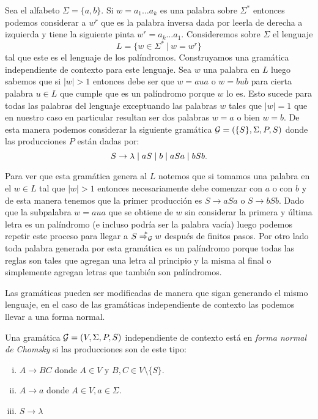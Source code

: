 \documentclass[tesis.tex]{subfiles}
\begin{document}
\begin{ej}\label{leng_ej_gram_palindromos}
	Sea el alfabeto $\Sigma = \{ a,b \}$. Si $w=a_1 \dots a_k$ es una palabra sobre $\Sigma^*$ entonces podemos considerar a $w^r$ que es la palabra inversa dada por leerla de derecha a izquierda y tiene la siguiente pinta $w^r= a_k \dots a_1$. 
	Consideremos sobre $\Sigma$ el lenguaje 
	\[
	L = \{ w \in \Sigma^* \ | \ w = w^r  \}
	\]
	tal que este es el lenguaje de los palíndromos. 
	Construyamos una gramática independiente de contexto para este lenguaje.
	Sea $w$ una palabra en $L$ luego sabemos que si $|w| > 1$ entonces debe ser que $w = a u a$ o $w = b u b$ para cierta palabra $u \in L$ que cumple que es un palíndromo porque $w$ lo es. 
	Esto sucede para todas las palabras del lenguaje exceptuando las palabras $w$ tales que $|w|=1$ que en nuestro caso en particular resultan ser dos palabras $w=a$ o bien $w = b$. 
	De esta manera podemos considerar la siguiente gramática ${\cal G}  =  (\{S\}, \Sigma, P, S )$ donde las producciones $P$ están dadas por:
	\begin{equation*}
		S  \to \lambda \\ \mid a \\ S  \mid  b \\ \mid aSa \\ \mid bSb. \\
	\end{equation*}

	Para ver que esta gramática genera al $L$ notemos que si tomamos una palabra en el $w \in L$ tal que $|w| > 1$ entonces necesariamente debe comenzar con $a$ o con $b$ y de esta manera tenemos que la primer producción es $S \to aSa$ o $S \to bSb$. 
	Dado que la subpalabra $w = aua$ que se obtiene de $w$ sin considerar la primera y última letra es un palíndromo (e incluso podría ser la palabra vacía) luego podemos repetir este proceso para llegar a $S \overset{*}{\Rightarrow_{\cal G}} w$ después de finitos pasos. 
	Por otro lado toda palabra generada por esta gramática es un palíndromo porque todas las reglas son tales que agregan una letra al principio y la misma al final o simplemente agregan letras que también son palíndromos.
\end{ej}

Las gramáticas pueden ser modificadas de manera que sigan generando el mismo lenguaje, en el caso de las gramáticas independiente de contexto las podemos llevar a una forma normal.

\begin{deff}
	Una gramática ${\cal G} = (V, \Sigma, P, S)$ independiente de contexto está en \emph{forma normal de Chomsky} si las producciones son de este tipo:
	\begin{enumerate}[i)]
		\item $A \to BC$ donde $A\in V$ y $B,C \in V \setminus \{ S \}$.
		\item $A \to a$ donde $A \in V, a \in \Sigma$.
		\item $S \to \lambda$ 
	\end{enumerate}
\end{deff}
\end{document}
